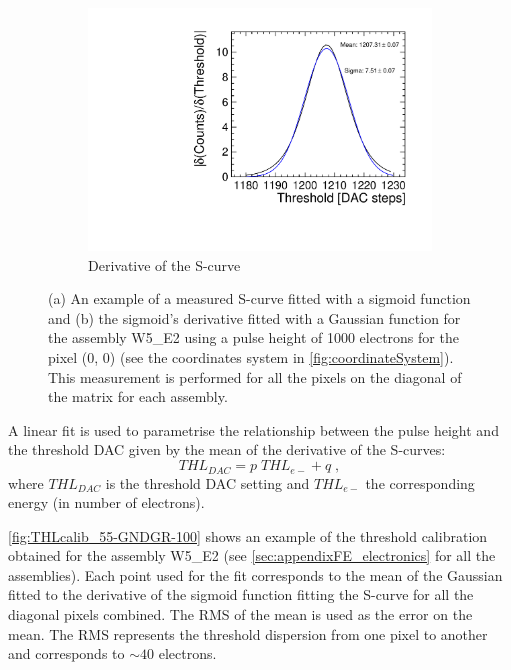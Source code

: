 \begin{figure}[htbp]
\begin{subfigure}[b]{0.45\textwidth}
    \includegraphics[width=\textwidth]{./figures/Calibration/W5_E2_deriv_scurve_ampl1.pdf}
    \caption{Derivative of the S-curve}
    \label{fig:deriv_example}
  \end{subfigure}
  \caption{(a) An example of a measured S-curve fitted with a sigmoid
    function and (b) the sigmoid's derivative fitted with a Gaussian
    function for the assembly W5\_E2 using a pulse height of 1000
    electrons for the pixel (0, 0) (see the coordinates system in
    \cref{fig:coordinateSystem}). This measurement is performed for
    all the pixels on the diagonal of the matrix for each assembly.}
  \label{fig:scurve_deriv_example}
\end{figure}

A linear fit is used to parametrise the relationship between the pulse
height and the threshold DAC given by the mean of the derivative of
the S-curves:
\begin{equation}
  THL_{DAC}=p \; THL_{e-} + q \; ,
  \label{eq:THLDAC}
\end{equation}
where $THL_{DAC}$ is the threshold DAC setting and $THL_{e-}$ the
corresponding energy (in number of electrons). 

\cref{fig:THLcalib_55-GNDGR-100} shows an example of the threshold
calibration obtained for the assembly W5\_E2 (see
\cref{sec:appendixFE_electronics} for all the assemblies). Each point
used for the fit corresponds to the mean of the Gaussian fitted to the
derivative of the sigmoid function fitting the S-curve for all the
diagonal pixels combined. The RMS of the mean is used as the error on
the mean. The RMS represents the threshold dispersion from one pixel
to another and corresponds to $\sim40$ electrons.

